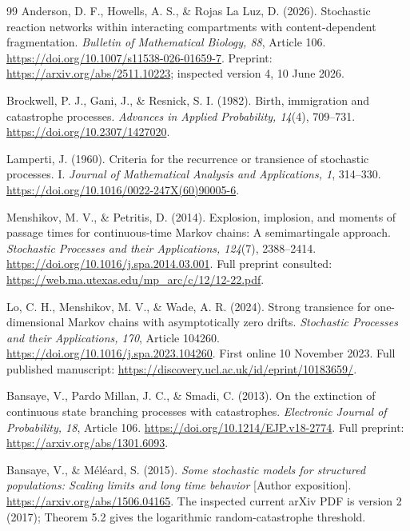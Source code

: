 \documentclass[11pt,a4paper]{article}
\theoremstyle{remark}\newtheorem{remark}[theorem]{Remark}
\begin{document}
\begin{thebibliography}{99}
Anderson, D. F., Howells, A. S., \& Rojas La Luz, D. (2026).
Stochastic reaction networks within interacting compartments with content-dependent fragmentation.
\emph{Bulletin of Mathematical Biology, 88}, Article 106.
\url{https://doi.org/10.1007/s11538-026-01659-7}.
Preprint: \url{https://arxiv.org/abs/2511.10223}; inspected version 4, 10 June 2026.

Brockwell, P. J., Gani, J., \& Resnick, S. I. (1982).
Birth, immigration and catastrophe processes.
\emph{Advances in Applied Probability, 14}(4), 709--731.
\url{https://doi.org/10.2307/1427020}.

Lamperti, J. (1960).
Criteria for the recurrence or transience of stochastic processes. I.
\emph{Journal of Mathematical Analysis and Applications, 1}, 314--330.
\url{https://doi.org/10.1016/0022-247X(60)90005-6}.

Menshikov, M. V., \& Petritis, D. (2014).
Explosion, implosion, and moments of passage times for continuous-time Markov chains: A semimartingale approach.
\emph{Stochastic Processes and their Applications, 124}(7), 2388--2414.
\url{https://doi.org/10.1016/j.spa.2014.03.001}.
Full preprint consulted: \url{https://web.ma.utexas.edu/mp_arc/c/12/12-22.pdf}.

Lo, C. H., Menshikov, M. V., \& Wade, A. R. (2024).
Strong transience for one-dimensional Markov chains with asymptotically zero drifts.
\emph{Stochastic Processes and their Applications, 170}, Article 104260.
\url{https://doi.org/10.1016/j.spa.2023.104260}.
First online 10 November 2023. Full published manuscript: \url{https://discovery.ucl.ac.uk/id/eprint/10183659/}.

Bansaye, V., Pardo Millan, J. C., \& Smadi, C. (2013).
On the extinction of continuous state branching processes with catastrophes.
\emph{Electronic Journal of Probability, 18}, Article 106.
\url{https://doi.org/10.1214/EJP.v18-2774}.
Full preprint: \url{https://arxiv.org/abs/1301.6093}.

Bansaye, V., \& M\'el\'eard, S. (2015).
\emph{Some stochastic models for structured populations: Scaling limits and long time behavior} [Author exposition].
\url{https://arxiv.org/abs/1506.04165}.
The inspected current arXiv PDF is version 2 (2017); Theorem 5.2 gives the logarithmic random-catastrophe threshold.


\end{thebibliography}
\end{document}

